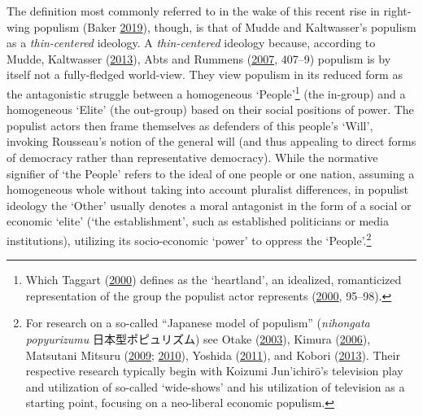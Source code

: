 \documentclass[10pt,british,A4paper,oneside]{memoir}
\begin{document}
The definition most commonly referred to in the wake of this recent rise
in right-wing populism (Baker
\protect\hyperlink{ref-baker_we_2019}{2019}), though, is that of Mudde
and Kaltwasser's populism as a \emph{thin-centered} ideology. A
\emph{thin-centered} ideology because, according to Mudde, Kaltwasser
(\protect\hyperlink{ref-mudde_oxford_2013}{2013}), Abts and Rummens
(\protect\hyperlink{ref-abts_populism_2007}{2007}, 407--9) populism is
by itself not a fully-fledged world-view. They view populism in its
reduced form as the antagonistic struggle between a homogeneous
`People'\footnote{Which Taggart
  (\protect\hyperlink{ref-taggart_populism_2000}{2000}) defines as the
  `heartland', an idealized, romanticized representation of the group
  the populist actor represents
  (\protect\hyperlink{ref-taggart_populism_2000}{2000}, 95--98).} (the
in-group) and a homogeneous `Elite' (the out-group) based on their
social positions of power. The populist actors then frame themselves as defenders of this people's `Will', invoking Rousseau's notion of the
general will (and thus appealing to direct forms of democracy rather
than representative democracy). While the normative signifier of `the
People' refers to the ideal of one people or one nation, assuming a
homogeneous whole without taking into account pluralist differences, in
populist ideology the `Other' usually denotes a moral antagonist in the
form of a social or economic `elite' (`the establishment', such as
established politicians or media institutions), utilizing its
socio-economic `power' to oppress the `People'.\footnote{For research on
  a so-called ``Japanese model of populism'' (\emph{nihongata
  popyurizumu} 日本型ポピュリズム) see Otake
  (\protect\hyperlink{ref-otake__2003}{2003}), Kimura
  (\protect\hyperlink{ref-kimura__2006}{2006}), Matsutani Mitsuru
  (\protect\hyperlink{ref-matsutani__2009}{2009};
  \protect\hyperlink{ref-matsutani_eng:_2010}{2010}), Yoshida
  (\protect\hyperlink{ref-yoshida__2011}{2011}), and Kobori
  (\protect\hyperlink{ref-kobori_populism_2013}{2013}). Their respective
  research typically begin with Koizumi Jun'ichirō's television play and
  utilization of so-called `wide-shows' and his utilization of
  television as a starting point, focusing on a neo-liberal economic
  populism.}
\end{document}
